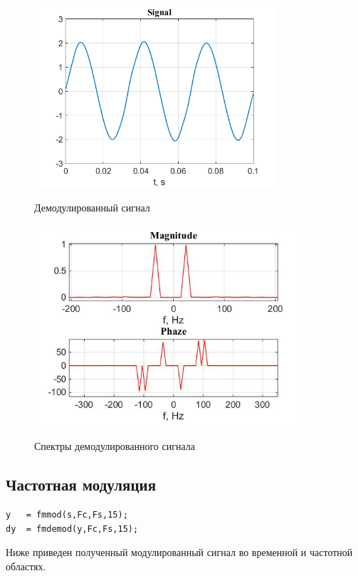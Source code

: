 \documentclass[a4paper,14pt]{article}
\begin{document}
\begin{figure}[h]
\begin{multicols}{1}
\hfill
\includegraphics[width=90mm]{phd}
\hfill
\caption{Демодулированный сигнал}
\label{figBottom}
\hfill
\includegraphics[width=100mm]{phd_spec}
\hfill
\caption{Спектры демодулированного сигнала}
\label{figDown}
\end{multicols}
\end{figure}

\newpage
\subsection{Частотная модуляция}

\begin{lstlisting}
y 	= fmmod(s,Fc,Fs,15);
dy 	= fmdemod(y,Fc,Fs,15);
\end{lstlisting}

Ниже приведен полученный модулированный сигнал во временной и частотной областях.
\end{document}
